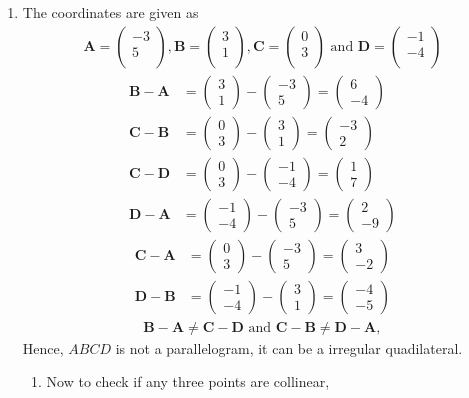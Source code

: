 \documentclass[12pt]{article}
\newcommand{\myvec}[1]{\ensuremath{\begin{pmatrix}#1\end{pmatrix}}}
\let\vec\mathbf
\begin{document}
\begin{enumerate}
\item The coordinates are given as
	\begin{align}
	\vec{A} = \myvec{
		-3\\
		5\\
		},
	\vec{B} = \myvec{
		3\\
		1\\
		},
	\vec{C} = \myvec{
		0\\
		3\\
		} \text{ and }
	\vec{D} = \myvec{
		-1\\
		-4\\
		}
	\end{align}
	\begin{align}
		\vec{B} - \vec{A} &= \myvec{3\\1} - \myvec{-3\\5} = \myvec{6\\-4}\\
		\vec{C} - \vec{B} &= \myvec{0\\3} - \myvec{3\\1} = \myvec{-3\\2}\\
		\vec{C} - \vec{D} &= \myvec{0\\3} - \myvec{-1\\-4} = \myvec{1\\7}\\
		\vec{D} - \vec{A} &= \myvec{-1\\-4} - \myvec{-3\\5} = \myvec{2\\-9}
	\end{align}
	\begin{align}
		\vec{C} - \vec{A} &= \myvec{0\\3} - \myvec{-3\\5} = \myvec{3\\-2}\\
		\vec{D} - \vec{B} &= \myvec{-1\\-4} - \myvec{3\\1} = \myvec{-4\\-5}
	\end{align}
	\begin{align}
	\vec{B}-\vec{A} \neq \vec{C}-\vec{D} \text{ and } \vec{C}-\vec{B} \neq \vec{D}-\vec{A},
	\end{align}
	Hence, $ABCD$ is not a parallelogram, it can be a irregular quadilateral.
	\begin{enumerate}
		\item Now to check if any three points are collinear,


\end{enumerate}
\end{enumerate}
\end{document}
